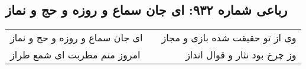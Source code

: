 \begin{center}
\section*{رباعی شماره ۹۳۲: ای جان سماع و روزه و حج و نماز}
\label{sec:0932}
\begin{longtable}{l p{0.5cm} r}
ای جان سماع و روزه و حج و نماز
&&
وی از تو حقیقت شده بازی و مجاز
\\
امروز منم مطربت ای شمع طراز
&&
وز چرخ بود نثار و قوال انداز
\\
\end{longtable}
\end{center}

